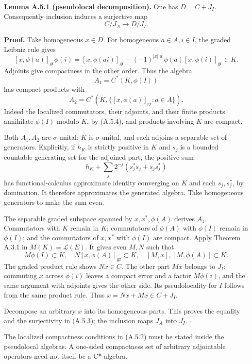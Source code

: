 \documentclass[
  11pt,
]{article}
\begin{document}
\textbf{Lemma A.5.1 (pseudolocal decomposition).} One has \(D=C+J_I\).
Consequently inclusion induces a surjective map \[
C/J_A\longrightarrow D/J_I.
\tag{A.5.3}
\]

\textbf{Proof.} Take homogeneous \(x\in D\). For homogeneous
\(a\in A,i\in I\), the graded Leibniz rule gives \[
[x,\phi(a)]_{\mathrm{gr}}\phi(i)
=[x,\phi(ai)]_{\mathrm{gr}}
-(-1)^{|x||a|}\phi(a)[x,\phi(i)]_{\mathrm{gr}}\in K.
\tag{A.5.4}
\] Adjoints give compactness in the other order. Thus the algebra \[
A_1=C^*(K,\phi(I))
\] has compact products with \[
A_2=C^*(K,\{[x,\phi(a)]_{\mathrm{gr}}:a\in A\}).
\tag{A.5.5}
\] Indeed the localized commutators, their adjoints, and their finite
products annihilate \(\phi(I)\) modulo \(K\), by (A.5.4), and products
involving \(K\) are compact.

Both \(A_1,A_2\) are \(\sigma\)-unital: \(K\) is \(\sigma\)-unital, and
each adjoins a separable set of generators. Explicitly, if \(h_K\) is
strictly positive in \(K\) and \(s_j\) is a bounded countable generating
set for the adjoined part, the positive sum \[
h_K+\sum_j2^{-j}(s_j^*s_j+s_js_j^*)
\tag{A.5.6}
\] has functional-calculus approximate identity converging on \(K\) and
each \(s_j,s_j^*\), by domination. It therefore approximates the
generated algebra. Take homogeneous generators to make the sum even.

The separable graded subspace spanned by \(x,x^*,\phi(A)\) derives
\(A_1\). Commutators with \(K\) remain in \(K\); commutators of
\(\phi(A)\) with \(\phi(I)\) remain in \(\phi(I)\); and the commutators
of \(x,x^*\) with \(\phi(I)\) are compact. Apply Theorem A.3.1 in
\(M(K)=\mathcal L(E)\). It gives even \(M,N\) such that \[
M\phi(I)\subset K,\quad
N[x,\phi(A)]_{\mathrm{gr}}\subset K,\quad
[M,x],[M,\phi(A)]\subset K.
\tag{A.5.7}
\] The graded product rule shows \(Nx\in C\). The other part \(Mx\)
belongs to \(J_I\): commuting \(x\) across \(\phi(i)\) leaves a compact
error and a factor \(M\phi(i)\), and the same argument with adjoints
gives the other side. Its pseudolocality for \(I\) follows from the same
product rule. Thus \(x=Nx+Mx\in C+J_I\).

Decompose an arbitrary \(x\) into its homogeneous parts. This proves the
equality and the surjectivity in (A.5.3); the inclusion maps \(J_A\)
into \(J_I\). \(\square\)

The localized compactness conditions in (A.5.2) must be stated inside
the pseudolocal algebras. A one-sided compactness set of arbitrary
adjointable operators need not itself be a C*-algebra.
\end{document}
